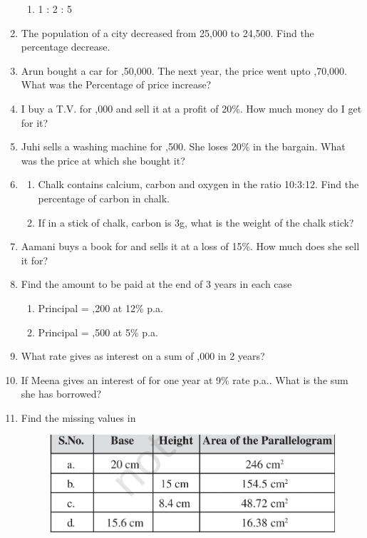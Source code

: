 \begin{enumerate}[label=\thesection.\arabic*,ref=\thesection.\theenumi,resume*]
\begin{enumerate}
		\item  1 : 2 : 5
	\end{enumerate}
\item  The population of a city decreased from 25,000 to 24,500. Find the percentage decrease.
\item  Arun bought a car for ,50,000. The next year, the price went upto ,70,000. What was the Percentage of price increase?
\item  I buy a T.V. for ,000 and sell it at a profit of 20\%. How much money do I get for it?
\item  Juhi sells a washing machine for ,500. She loses 20\% in the bargain. What was the price at which she bought it?
\item 
	\begin{enumerate}
		\item Chalk contains calcium, carbon and oxygen in the ratio 10:3:12. Find the percentage of carbon in chalk.
		\item  If in a stick of chalk, carbon is 3g, what is the weight of the chalk stick?
	\end{enumerate}
\item Aamani buys a book for  and sells it at a loss of 15\%. How much does she sell it for?
\item  Find the amount to be paid at the end of 3 years in each case
	\begin{enumerate}
\item  Principal = ,200 at 12\% p.a.
\item  Principal = ,500 at 5\% p.a.
	\end{enumerate}
\item  What rate gives  as interest on a sum of ,000 in 2 years? 
\item  If Meena gives an interest of  for one year at 9\% rate p.a.. What is the sum she has borrowed?
\item	Find the missing values
	in
	\begin{figure}[H]
  \centering
  \includegraphics[width=\columnwidth]{figs/area.jpg}

\end{figure}
\end{enumerate}
